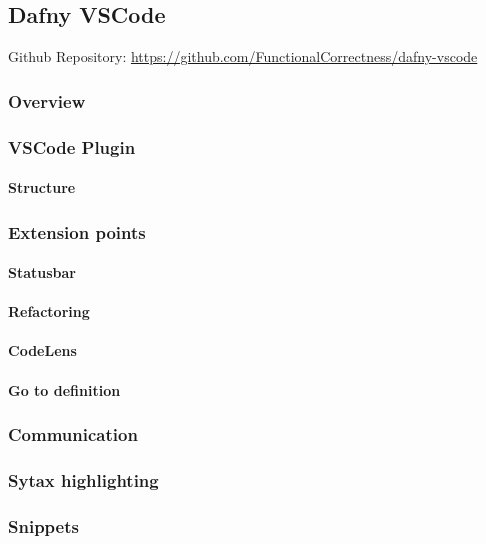 \subsection{Dafny VSCode}
Github Repository: \href{https://github.com/FunctionalCorrectness/dafny-vscode}{https://github.com/FunctionalCorrectness/dafny-vscode}

\subsubsection{Overview}

\subsubsection{VSCode Plugin}
\paragraph{Structure}

\subsubsection{Extension points}

\paragraph{Statusbar}
\paragraph{Refactoring}
\paragraph{CodeLens}
\paragraph{Go to definition}

\subsubsection{Communication}

\subsubsection{Sytax highlighting}

\subsubsection{Snippets}

